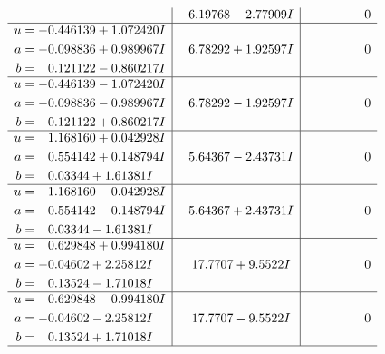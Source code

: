\documentclass[1p]{elsarticle_modified}
\theoremstyle{definition}
\begin{document}
$$\begin{array}{c|c|c}
 & \phantom{-}6.19768 - 2.77909 I & \phantom{-0.000000 } 0 \\ \hline\begin{aligned}
u &= -0.446139 + 1.072420 I \\
a &= -0.098836 + 0.989967 I \\
b &= \phantom{-}0.121122 - 0.860217 I\end{aligned}
 & \phantom{-}6.78292 + 1.92597 I & \phantom{-0.000000 } 0 \\ \hline\begin{aligned}
u &= -0.446139 - 1.072420 I \\
a &= -0.098836 - 0.989967 I \\
b &= \phantom{-}0.121122 + 0.860217 I\end{aligned}
 & \phantom{-}6.78292 - 1.92597 I & \phantom{-0.000000 } 0 \\ \hline\begin{aligned}
u &= \phantom{-}1.168160 + 0.042928 I \\
a &= \phantom{-}0.554142 + 0.148794 I \\
b &= \phantom{-}0.03344 + 1.61381 I\end{aligned}
 & \phantom{-}5.64367 - 2.43731 I & \phantom{-0.000000 } 0 \\ \hline\begin{aligned}
u &= \phantom{-}1.168160 - 0.042928 I \\
a &= \phantom{-}0.554142 - 0.148794 I \\
b &= \phantom{-}0.03344 - 1.61381 I\end{aligned}
 & \phantom{-}5.64367 + 2.43731 I & \phantom{-0.000000 } 0 \\ \hline\begin{aligned}
u &= \phantom{-}0.629848 + 0.994180 I \\
a &= -0.04602 + 2.25812 I \\
b &= \phantom{-}0.13524 - 1.71018 I\end{aligned}
 & \phantom{-}17.7707 + 9.5522 I & \phantom{-0.000000 } 0 \\ \hline\begin{aligned}
u &= \phantom{-}0.629848 - 0.994180 I \\
a &= -0.04602 - 2.25812 I \\
b &= \phantom{-}0.13524 + 1.71018 I\end{aligned}
 & \phantom{-}17.7707 - 9.5522 I & \phantom{-0.000000 } 0\\
 \hline 
 \end{array}$$\newpage$$\begin{array}{c|c|c}  

\end{array}$$
\end{document}
